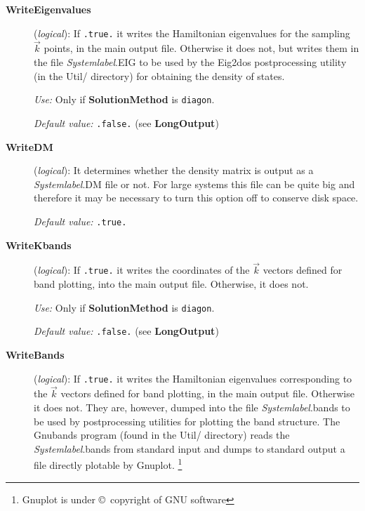 \documentclass[11pt]{article}
\begin{document}
\begin{description}
 
\item[{\bf WriteEigenvalues}] ({\it logical}):
If {\tt .true.} it writes the Hamiltonian eigenvalues for the sampling
$\vec k$ points, in the main output file.
Otherwise it does not, but writes them in the file {\it Systemlabel}.EIG
to be used by the {\sc Eig2dos} postprocessing 
utility (in the Util/ directory) for obtaining the density of
states.

{\it Use:} Only if {\bf SolutionMethod} is {\tt diagon}.
 
{\it Default value:} {\tt .false.} (see {\bf LongOutput})

\item[{\bf WriteDM}] ({\it logical}): 
 It determines whether the density matrix
is output as a {\it Systemlabel}.DM file or not. For large systems
this file can be quite big and therefore it may be necessary to turn
this option off to conserve disk space.

{\it Default value:} {\tt .true.}

\item[{\bf WriteKbands}] ({\it logical}):
If {\tt .true.} it writes the coordinates of the $\vec k$ vectors
defined for band plotting, into the main output file.
Otherwise, it does not.

{\it Use:} Only if {\bf SolutionMethod} is {\tt diagon}.

{\it Default value:} {\tt .false.} (see {\bf LongOutput})


\item[{\bf WriteBands}] ({\it logical}):  If {\tt .true.} it writes
the Hamiltonian eigenvalues corresponding to the $\vec k$ vectors
defined for band plotting, in the main output file.  Otherwise it does
not. They are, however, dumped into the file {\it Systemlabel}.bands
to be used by postprocessing utilities for plotting the band
structure. The {\sc Gnubands} program
(found in the Util/ directory) reads the {\it Systemlabel}.bands from
standard input and dumps to standard output a file directly plotable
by {\sc Gnuplot}.
\footnote{{\sc Gnuplot} is under \copyright\ copyright of GNU software}


\end{description}
\end{document}
